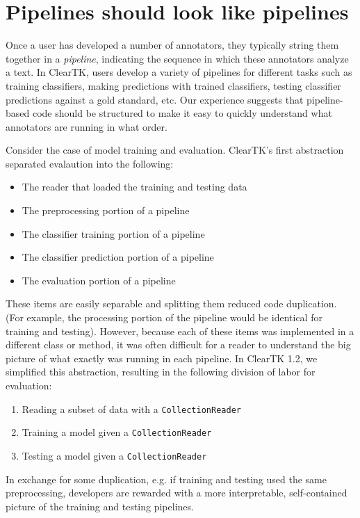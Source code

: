 \documentclass[10pt, a4paper]{article}
\newcommand{\code}[1]{\texttt{\small #1}}
\begin{document}

\section{Pipelines should look like pipelines}
Once a user has developed a number of annotators, they typically string them together in a \emph{pipeline}, indicating the sequence in which these annotators analyze a text.
In ClearTK, users develop a variety of pipelines for different tasks such as training classifiers, making predictions with trained classifiers, testing classifier predictions against a gold standard, etc.  Our experience suggests that pipeline-based code should be structured to make it easy to quickly understand what annotators are running in what order.

Consider the case of model training and evaluation.
ClearTK's first abstraction separated evalaution into the following:
\begin{itemize}
\item The reader that loaded the training and testing data
\item The preprocessing portion of a pipeline
\item The classifier training portion of a pipeline
\item The classifier prediction portion of a pipeline
\item The evaluation portion of a pipeline
\end{itemize}
These items are easily separable and splitting them reduced code duplication. (For example, the processing portion of the pipeline would be identical for training and testing).
However, because each of these items was implemented in a different class or method, it was often difficult for a reader to understand the big picture of what exactly was running in each pipeline.
In ClearTK 1.2, we simplified this abstraction, resulting in the following division of labor for evaluation:
\begin{enumerate}
\item Reading a subset of data with a \code{CollectionReader}
\item Training a model given a \code{CollectionReader}
\item Testing a model given a \code{CollectionReader}
\end{enumerate}
In exchange for some duplication, e.g. if training and testing used the same preprocessing, developers are rewarded with a more interpretable, self-contained picture of the training and testing pipelines.
\end{document}
